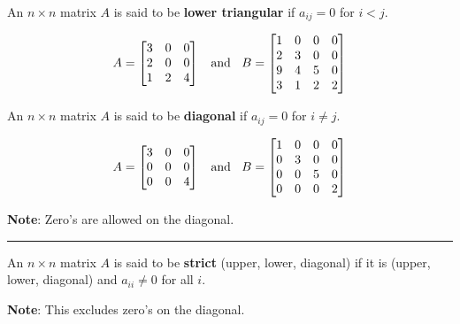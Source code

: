 %
\begin{definition}
 An $n \times n$ matrix $A$ is said to be \textbf{lower triangular} if $a_{ij} = 0$ for $i<j$.  
\end{definition}
\begin{example}
\[ A = \begin{bmatrix}  3 &  0  & 0\\ 2 & 0  &  0 \\  1 &  2 &  4   \end{bmatrix}   \text{\;\; and \;\;} B = \begin{bmatrix}  1 &  0  & 0 &  0\\ 2 & 3  &  0  &  0 \\  9 &  4 &  5 &  0 \\ 3  &  1   &   2   & 2  \end{bmatrix}  \]
\end{example}







%
\begin{definition}
 An $n \times n$ matrix $A$ is said to be \textbf{diagonal} if $a_{ij} = 0$ for $i \ne j$.  
\end{definition}

\begin{example}
\[ A = \begin{bmatrix}  3 &  0  & 0\\ 0 & 0  &  0 \\  0 &  0 &  4   \end{bmatrix}   \text{\;\; and \;\;} B = \begin{bmatrix}  1 &  0  & 0 &  0\\ 0 & 3  &  0  &  0 \\  0 &  0 &  5 &  0 \\ 0  &  0   &   0   & 2  \end{bmatrix}  \]
\end{example}



\textbf{Note}:  Zero's are allowed on the diagonal.  


\rule[0.01in]{\textwidth}{0.0025in}





%
\begin{definition}
 An $n \times n$ matrix $A$ is said to be \textbf{strict} (upper, lower, diagonal) if it is (upper, lower, diagonal) and $a_{ii} \ne 0$ for all $i$.
 
 \textbf{Note}:  This excludes zero's on the diagonal.   
\end{definition}



